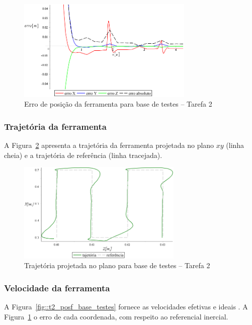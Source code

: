 \begin{figure}[h!]
	\centering 
 	\includegraphics[width=0.75\textwidth]{figs/t2_erroposf_base_testes}
 	\caption{Erro de posição da ferramenta para base de testes -- Tarefa 2}
 	\label{fig::t2_erroposf_base_testes}
\end{figure}


\subsubsection{Trajetória da ferramenta}

A Figura~\ref{fig::t2_traj_base_testes} apresenta a trajetória da ferramenta
projetada no plano $xy$ (linha cheia) e a trajetória de referência (linha
tracejada).

\begin{figure}[h!]
	\centering 
 	\includegraphics[width=0.70\textwidth]{figs/t2_traj_base_testes}
 	\caption{Trajetória projetada no plano para base de testes -- Tarefa 2}
 	\label{fig::t2_traj_base_testes}
\end{figure}


\subsubsection{Velocidade da ferramenta}

A Figura~\ref{fig::t2_posf_base_testes} fornece as velocidades
efetivas e ideais . A Figura~\ref{fig::t2_erroposf_base_testes} o erro de cada
coordenada, com respeito ao referencial inercial.

